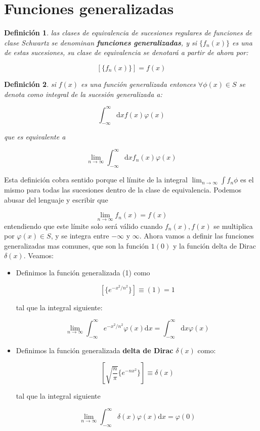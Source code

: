\documentclass[12pt]{book}
\newcommand{\D}{\mathrm{d}}
\newcommand{\inti}{\int_{-\infty}^{\infty}}
\newtheorem{definicion}{Definición}[section]
\begin{document}
\section{Funciones generalizadas}

\begin{definicion}
las clases de equivalencia de sucesiones regulares de funciones de clase Schwartz se denominan \textbf{funciones generalizadas}, y si $\{ f_n (x) \}$ es una de estas sucesiones, su clase de equivalencia se denotará a partir de ahora por:

$$ \left[ \{ f_n (x) \} \right] = f(x) $$
\end{definicion}

\begin{definicion}
si $f(x)$ es una función generalizada entonces $\forall \phi (x) \in S$ se denota como integral de la sucesión generalizada a:

$$ \inti \D x f(x) \varphi(x)  $$

que es equivalente a 

$$ \lim_{n \rightarrow \infty} \inti \D x f_n(x) \varphi (x) $$
\end{definicion}

Esta definición cobra sentido porque el límite de la integral $\lim_{n \rightarrow \infty} \int f_n \phi$ es el mismo para todas las sucesiones dentro de la clase de equivalencia. Podemos abusar del lenguaje y escribir que

\begin{equation}
\lim_{n \rightarrow \infty} f_n (x) = f(x)
\end{equation}
entendiendo que este límite solo será válido cuando $f_n (x),f(x)$ se multiplica por $\varphi (x) \in S$, y se integra entre $- \infty$ y $\infty$. Ahora vamos a definir las funciones generalizadas mas comunes, que son la función $1(0)$ y la función delta de Dirac $\delta(x)$. Veamos:

\begin{itemize}
\item Definimos la función generalizada (1) como 

$$ [ \{ e^{-x^2/n^2} \} ] \equiv (1) =  1 $$

tal que la integral siguiente:
 
$$ \lim_{n \rightarrow \infty} \inti e^{-x^2 / n^2} \varphi (x) \D x = \inti \D x \varphi (x) $$ 

\item Definimos la función generalizada \textbf{delta de Dirac} $\delta (x)$ como:

$$ [  \sqrt{\dfrac{n}{\pi}} \{ e^{-nx^2} \} ] \equiv \delta (x) $$

tal que la integral siguiente

$$ \lim_{n \rightarrow \infty} \inti \delta(x) \varphi (x) \D x = \varphi (0) $$ 
\end{itemize}
\end{document}
